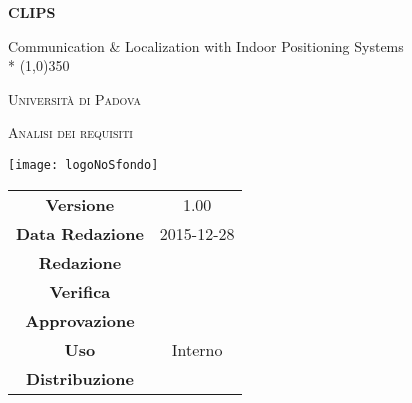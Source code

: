 \documentclass[a4paper,12pt]{article}
\author{Oscar Elia Conti, Marco Zanella}
\date{24/12/2015}
\begin{document}
	\begin{titlepage}
		\centering
		{\huge\bfseries CLIPS\par}
		Communication \& Localization with Indoor Positioning Systems \\*
		\line(1,0){350} \\
		{\scshape\LARGE Università di Padova \par}
		\vspace{1cm}
		{\scshape\Large Analisi dei requisiti\par}
		\vspace{2cm}
		\begin{center}
		{\texttt{[image: logoNoSfondo]} \par}
		\end{center}
		\vfill \vfill
		\begin{tabular}{c|c}
			{\hfill \textbf{Versione}} 			& 1.00			\\
			{\hfill\textbf{Data Redazione}} 		& 2015-12-28  		\\ 
			{\hfill\textbf{Redazione}} 			&      \\
			{\hfill\textbf{Verifica}} 				&  \\ 
			{\hfill\textbf{Approvazione}} 		&  \\
			{\hfill\textbf{Uso}} 					& Interno			\\
			{\hfill\textbf{Distribuzione}} 			& \leaf			\\
		\end{tabular}
	\end{titlepage}
	\newpage
		\pagestyle{myfront}
		
	
	\newpage
		\tableofcontents
	\label{LastFrontPage}
	
	\newpage
	\pagestyle{mymain}
		
	

		
	\label{LastPage}
\end{document}
